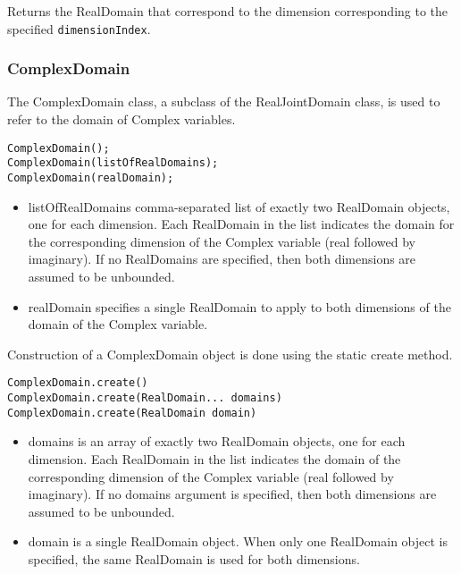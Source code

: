 Returns the RealDomain that correspond to the dimension corresponding to the specified \texttt{dimensionIndex}.

\fi


\subsubsection{ComplexDomain}
\label{sec:ComplexDomain}

The ComplexDomain class, a subclass of the RealJointDomain class, is used to refer to the domain of Complex variables.


\ifmatlab
\begin{lstlisting}
ComplexDomain();
ComplexDomain(listOfRealDomains);
ComplexDomain(realDomain);
\end{lstlisting}

\begin{itemize}
\item listOfRealDomains comma-separated list of exactly two RealDomain objects, one for each dimension.  Each RealDomain in the list indicates the domain for the corresponding dimension of the Complex variable (real followed by imaginary).  If no RealDomains are specified, then both dimensions are assumed to be unbounded.
\item realDomain specifies a single RealDomain to apply to both dimensions of the domain of the Complex variable.
\end{itemize}
\fi

\ifjava
Construction of a ComplexDomain object is done using the static create method.

\begin{lstlisting}
ComplexDomain.create()
ComplexDomain.create(RealDomain... domains)
ComplexDomain.create(RealDomain domain)
\end{lstlisting}

\begin{itemize}
\item domains is an array of exactly two RealDomain objects, one for each dimension.  Each RealDomain in the list indicates the domain of the corresponding dimension of the Complex variable (real followed by imaginary).  If no domains argument is specified, then both dimensions are assumed to be unbounded.
\item domain is a single RealDomain object.  When only one RealDomain object is specified, the same RealDomain is used for both dimensions.
\end{itemize}
\fi

